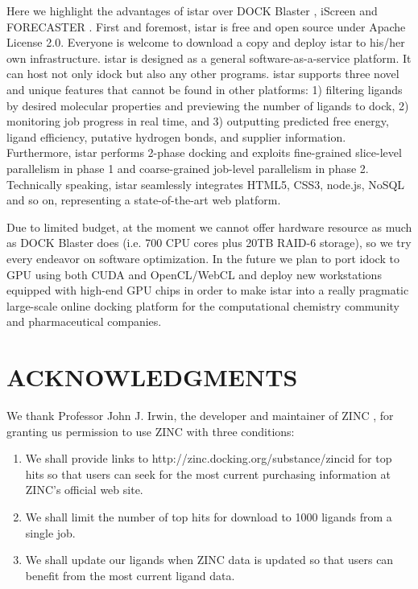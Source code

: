 \documentclass[12pt]{article}
\begin{document}
Here we highlight the advantages of istar over DOCK Blaster \citep{557}, iScreen \citep{899} and FORECASTER \citep{1012}. First and foremost, istar is free and open source under Apache License 2.0. Everyone is welcome to download a copy and deploy istar to his/her own infrastructure. istar is designed as a general software-as-a-service platform. It can host not only idock but also any other programs. istar supports three novel and unique features that cannot be found in other platforms: 1) filtering ligands by desired molecular properties and previewing the number of ligands to dock, 2) monitoring job progress in real time, and 3) outputting predicted free energy, ligand efficiency, putative hydrogen bonds, and supplier information. Furthermore, istar performs 2-phase docking and exploits fine-grained slice-level parallelism in phase 1 and coarse-grained job-level parallelism in phase 2. Technically speaking, istar seamlessly integrates HTML5, CSS3, node.js, NoSQL and so on, representing a state-of-the-art web platform.

Due to limited budget, at the moment we cannot offer hardware resource as much as DOCK Blaster does (i.e. 700 CPU cores plus 20TB RAID-6 storage), so we try every endeavor on software optimization. In the future we plan to port idock to GPU using both CUDA and OpenCL/WebCL and deploy new workstations equipped with high-end GPU chips in order to make istar into a really pragmatic large-scale online docking platform for the computational chemistry community and pharmaceutical companies.

\section*{\sffamily \large ACKNOWLEDGMENTS}

We thank Professor John J. Irwin, the developer and maintainer of ZINC \citep{532,1178}, for granting us permission to use ZINC with three conditions:
\begin{enumerate}
\item We shall provide links to http://zinc.docking.org/substance/zincid for top hits so that users can seek for the most current purchasing information at ZINC's official web site.
\item We shall limit the number of top hits for download to 1000 ligands from a single job.
\item We shall update our ligands when ZINC data is updated so that users can benefit from the most current ligand data.
\end{enumerate}
\end{document}
